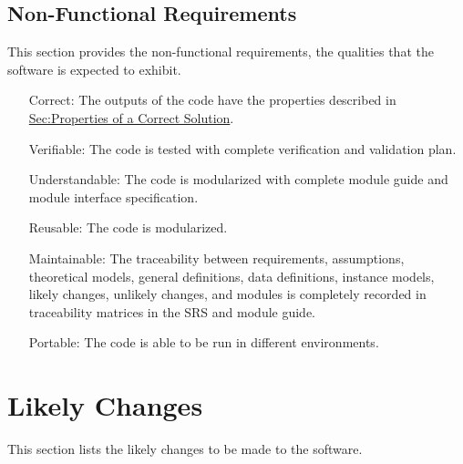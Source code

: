 \documentclass[12pt]{article}
\begin{document}
\subsection{Non-Functional Requirements}
\label{Sec:NFRs}
This section provides the non-functional requirements, the qualities that the software is expected to exhibit.

\begin{itemize}
\item[Correct:\phantomsection\label{correct}]{The outputs of the code have the properties described in \hyperref[Sec:CorSolProps]{Sec:Properties of a Correct Solution}.}
\item[Verifiable:\phantomsection\label{verifiable}]{The code is tested with complete verification and validation plan.}
\item[Understandable:\phantomsection\label{understandable}]{The code is modularized with complete module guide and module interface specification.}
\item[Reusable:\phantomsection\label{reusable}]{The code is modularized.}
\item[Maintainable:\phantomsection\label{maintainable}]{The traceability between requirements, assumptions, theoretical models, general definitions, data definitions, instance models, likely changes, unlikely changes, and modules is completely recorded in traceability matrices in the SRS and module guide.}
\item[Portable:\phantomsection\label{portable}]{The code is able to be run in different environments.}
\end{itemize}
\section{Likely Changes}
\label{Sec:LCs}
This section lists the likely changes to be made to the software.
\end{document}
